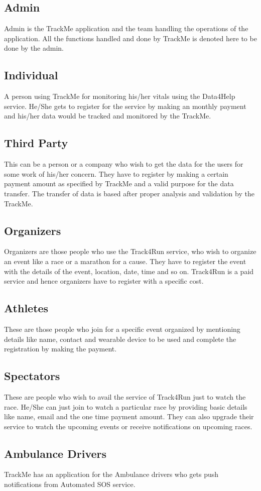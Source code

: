 \subsection{Admin}
Admin is the TrackMe application and the team handling the operations of the application. All the functions handled and done by TrackMe is denoted here to be done by the admin.
\subsection{Individual}
A person using TrackMe for monitoring his/her vitals using the Data4Help service. He/She gets to register for the service by making an monthly payment and his/her data would be tracked and monitored by the TrackMe.
\subsection{Third Party} 
This can be a person or a company who wish to get the data for the users for some work of his/her concern. They have to register by making a certain payment amount as specified by TrackMe and a valid purpose for the data transfer. The transfer of data is based after proper analysis and validation by the TrackMe.
\subsection{Organizers}
Organizers are those people who use the Track4Run service, who wish to organize an event like a race or a marathon for a cause. They have to register the event with the details of the event, location, date, time and so on. Track4Run is a paid service and hence organizers have to register with a specific cost.
\subsection{Athletes} 
These are those people who join for a specific event organized by mentioning details like name, contact and wearable device to be used and complete the registration by making the payment.
\subsection{Spectators}
These are people who wish to avail the service of Track4Run just to watch the race. He/She can just join to watch a particular race by providing basic details like name, email and the one time payment amount. They can also upgrade their service to watch the upcoming events or receive notifications on upcoming races.
\subsection{Ambulance Drivers}
TrackMe has an application for the Ambulance drivers who gets push notifications from Automated SOS service.  
